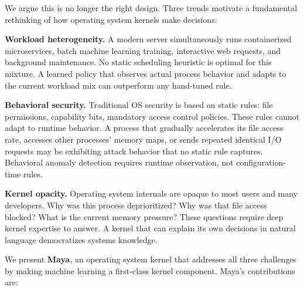 \documentclass[letterpaper,twocolumn,10pt]{article}
\begin{document}
We argue this is no longer the right design.
Three trends motivate a fundamental rethinking
of how operating system kernels make decisions:

\textbf{Workload heterogeneity.} A modern server
simultaneously runs containerized microservices,
batch machine learning training, interactive
web requests, and background maintenance. No
static scheduling heuristic is optimal for
this mixture. A learned policy that observes
actual process behavior and adapts to the
current workload mix can outperform any
hand-tuned rule.

\textbf{Behavioral security.} Traditional OS
security is based on static rules: file
permissions, capability bits, mandatory access
control policies. These rules cannot adapt to
runtime behavior. A process that gradually
accelerates its file access rate, accesses
other processes' memory maps, or sends repeated
identical I/O requests may be exhibiting attack
behavior that no static rule captures. Behavioral
anomaly detection requires runtime observation,
not configuration-time rules.

\textbf{Kernel opacity.} Operating system
internals are opaque to most users and many
developers. Why was this process deprioritized?
Why was that file access blocked? What is the
current memory pressure? These questions require
deep kernel expertise to answer. A kernel that
can explain its own decisions in natural language
democratizes systems knowledge.

We present \textbf{Maya}, an operating system
kernel that addresses all three challenges by
making machine learning a first-class kernel
component. Maya's contributions are:
\end{document}
